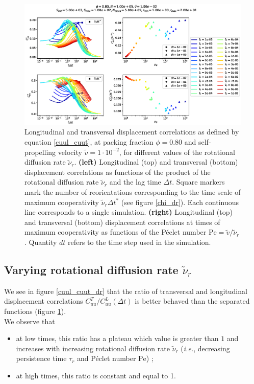 \documentclass[class=report, float=false, crop=false]{standalone}
\begin{document}
\begin{figure}[h!]
\centering
\includegraphics[width=\textwidth]{figures/figs/CuuLCuuT_Dk8000_Vj1000_Nq1000_Io5000_Mn1000_Cn5000_separate.eps}
\caption{Longitudinal and transversal displacement correlations as defined by equation \ref{cuul_cuut}, at packing fraction $\phi=0.80$ and self-propelling velocity $\tilde{v}=1\cdot10^{-2}$, for different values of the rotational diffusion rate $\tilde{\nu}_r$. \textbf{(left)} Longitudinal (top) and transversal (bottom) displacement correlations as functions of the product of the rotational diffusion rate $\tilde{\nu}_r$ and the lag time $\Delta t$. Square markers mark the number of reorientations corresponding to the time scale of maximum cooperativity $\tilde{\nu}_r \Delta t^*$ (see figure \ref{chi_dr}). Each continuous line corresponds to a single simulation. \textbf{(right)} Longitudinal (top) and transversal (bottom) displacement correlations at times of maximum cooperativity as functions of the P\'eclet number $\text{Pe} = \tilde{v}/\tilde{\nu}_r$. Quantity $dt$ refers to the time step used in the simulation.}
\label{cuul_cuut_separate}
\end{figure}

\subsection{Varying rotational diffusion rate $\tilde{\nu}_r$}

We see in figure \ref{cuul_cuut_dr} that the ratio of transversal and longitudinal displacement correlations $C_{uu}^T/C_{uu}^L(\Delta t)$ is better behaved than the separated functions (figure \ref{cuul_cuut_separate}).\\

We observe that
\begin{itemize}
  \item at low times, this ratio has a plateau which value is greater than $1$ and increases with increasing rotational diffusion rate $\tilde{\nu}_r$ (\textit{i.e.}, decreasing persistence time $\tau_r$ and P\'eclet number $\text{Pe}$) ;
  \item at high times, this ratio is constant and equal to 1.\\
\end{itemize}
\end{document}
